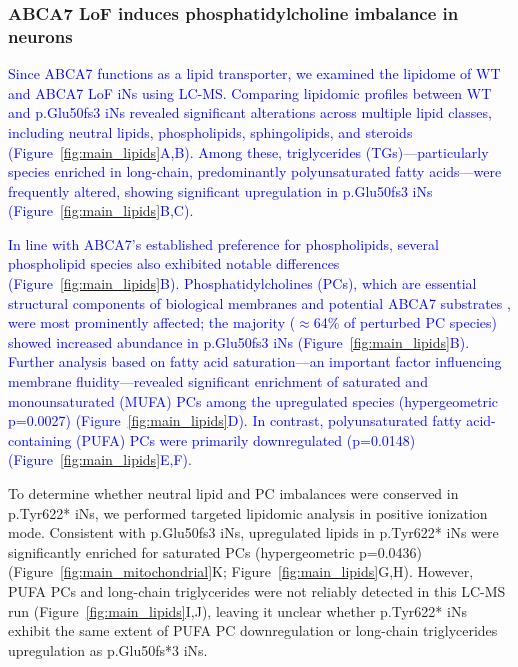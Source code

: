 \subsubsection{ABCA7 LoF induces phosphatidylcholine imbalance in neurons}
\newcommand{\quoteA}{\textcolor{blue}{Since ABCA7 functions as a lipid transporter, we examined the lipidome of WT and ABCA7 LoF iNs using LC-MS. Comparing lipidomic profiles between WT and p.Glu50fs3 iNs revealed significant alterations across multiple lipid classes, including neutral lipids, phospholipids, sphingolipids, and steroids (Figure~\ref{fig:main_lipids}A,B). Among these, triglycerides (TGs)—particularly species enriched in long-chain, predominantly polyunsaturated fatty acids—were frequently altered, showing significant upregulation in p.Glu50fs3 iNs (Figure~\ref{fig:main_lipids}B,C).\label{quoteA-label}}}
\quoteA

\newcommand{\quoteB}{\textcolor{blue}{In line with ABCA7's established preference for phospholipids\cite{Tomioka2017-sq,Picataggi2022-hf,Fang2025}, several phospholipid species also exhibited notable differences (Figure~\ref{fig:main_lipids}B). Phosphatidylcholines (PCs), which are essential structural components of biological membranes and potential ABCA7 substrates \cite{LeThiMy2022-dp,Fang2025}, were most prominently affected; the majority ($\approx$64\% of perturbed PC species) showed increased abundance in p.Glu50fs3 iNs (Figure~\ref{fig:main_lipids}B). Further analysis based on fatty acid saturation—an important factor influencing membrane fluidity—revealed significant enrichment of saturated and monounsaturated (MUFA) PCs among the upregulated species (hypergeometric p=0.0027) (Figure~\ref{fig:main_lipids}D). In contrast, polyunsaturated fatty acid-containing (PUFA) PCs were primarily downregulated (p=0.0148) (Figure~\ref{fig:main_lipids}E,F).}}
\quoteB

To determine whether neutral lipid and PC imbalances were conserved in p.Tyr622* iNs, we performed targeted lipidomic analysis in positive ionization mode. Consistent with p.Glu50fs3 iNs, upregulated lipids in p.Tyr622* iNs were significantly enriched for saturated PCs (hypergeometric p=0.0436) (Figure~\ref{fig:main_mitochondrial}K; Figure~\ref{fig:main_lipids}G,H). However, PUFA PCs and long-chain triglycerides were not reliably detected in this LC-MS run (Figure~\ref{fig:main_lipids}I,J), leaving it unclear whether p.Tyr622* iNs exhibit the same extent of PUFA PC downregulation or long-chain triglycerides upregulation as p.Glu50fs*3 iNs.

